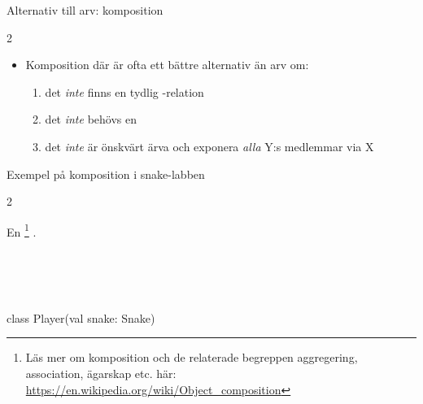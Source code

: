 \begin{Slide}{Alternativ till arv: komposition}
\begin{multicols}{2}
\end{multicols}
\begin{itemize}
\item Komposition där  är ofta ett bättre alternativ än arv om: 
\begin{enumerate} \SlideFontTiny
\item det \emph{inte} finns en tydlig -relation 
\item det \emph{inte} behövs en 
\item det \emph{inte} är önskvärt ärva och exponera \emph{alla} Y:s medlemmar via X
\end{enumerate}
\end{itemize}
\end{Slide}

\begin{Slide}{Exempel på komposition i snake-labben}

\begin{multicols}{2}


En   \footnote{Läs mer om komposition och de relaterade begreppen aggregering, association, ägarskap etc. här:\\\url{https://en.wikipedia.org/wiki/Object_composition}}
 .\\~\\

\newcommand{\TextBox}[1]{\raisebox{0pt}[1em][0.5em]{#1}}

\columnbreak

~\\~\\

\begin{Code}
class Player(val snake: Snake)
\end{Code} 

\end{multicols}

\end{Slide}

